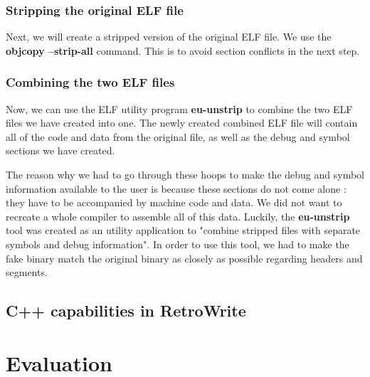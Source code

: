 \documentclass[a4paper,11pt,oneside]{report}
\begin{document}
\subsection{Stripping the original ELF file}

Next, we will create a stripped version of the original ELF file.
We use the \textbf{objcopy --strip-all} command.
This is to avoid section conflicts in the next step.

\subsection{Combining the two ELF files}
\label{combiningelf}

Now, we can use the ELF utility program \textbf{eu-unstrip} to combine the two 
ELF files we have created into one.
The newly created combined ELF file will contain all of the code and data from 
the original file, as well as the debug and symbol sections we have created.

The reason why we had to go through these hoops to make the debug and symbol
information available to the user is because these sections do not come alone
: they have to be accompanied by machine code and data.
We did not want to recreate a whole compiler to assemble all of this data.
Luckily, the \textbf{eu-unstrip} tool was created as an utility application
to "combine stripped files with separate symbols and debug information".
In order to use this tool, we had to make the fake binary match the original
binary as closely as possible regarding headers and segments.


\section{C++ capabilities in RetroWrite}
\label{retrowriteimplementation}


\chapter{Evaluation}

\end{document}
